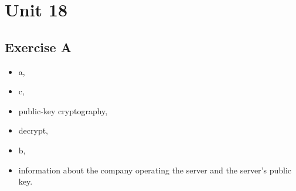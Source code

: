 \documentclass[a5paper,10pt,notitlepage,pdftex,headsepline]{scrartcl}
\begin{document}
\section{Unit 18}
  \subsection{Exercise A}
    \begin{itemize}
      \item a,
      \item c,
      \item public-key cryptography,
      \item decrypt,
      \item b,
      \item information about the company operating the server and the
        server's public key.
    \end{itemize}
\end{document}
